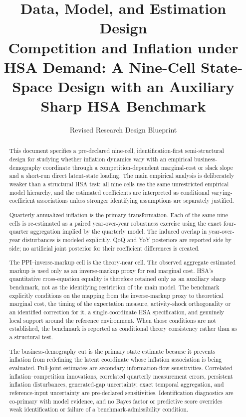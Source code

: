 \documentclass[11pt]{article}
\title{\textbf{Data, Model, and Estimation Design}\\
\large Competition and Inflation under HSA Demand: A Nine-Cell State-Space Design with an Auxiliary Sharp HSA Benchmark}
\author{}
\date{Revised Research Design Blueprint}
\begin{document}
\maketitle

\begin{abstract}
This document specifies a pre-declared nine-cell, identification-first semi-structural design for studying whether inflation dynamics vary with an empirical business-demography coordinate through a competition-dependent marginal-cost or slack slope and a short-run direct latent-state loading. The main empirical analysis is deliberately weaker than a structural HSA test: all nine cells use the same unrestricted empirical model hierarchy, and the estimated coefficients are interpreted as conditional varying-coefficient associations unless stronger identifying assumptions are separately justified.

Quarterly annualized inflation is the primary transformation. Each of the same nine cells is re-estimated as a paired year-over-year robustness exercise using the exact four-quarter aggregation implied by the quarterly model. The induced overlap in year-over-year disturbances is modeled explicitly. QoQ and YoY posteriors are reported side by side; no artificial joint posterior for their coefficient differences is created.

The PPI--inverse-markup cell is the theory-near cell. The observed aggregate estimated markup is used only as an inverse-markup proxy for real marginal cost. HSA's quantitative cross-equation equality is therefore retained only as an auxiliary sharp benchmark, not as the identifying restriction of the main model. The benchmark explicitly conditions on the mapping from the inverse-markup proxy to theoretical marginal cost, the timing of the expectation measure, activity-shock orthogonality or an identified correction for it, a single-coordinate HSA specification, and genuinely local support around the reference environment. When those conditions are not established, the benchmark is reported as conditional theory consistency rather than as a structural test.

The business-demography cut is the primary state estimate because it prevents inflation from redefining the latent coordinate whose inflation association is being evaluated. Full-joint estimates are secondary information-flow sensitivities. Correlated inflation--competition innovations, correlated quarterly measurement errors, persistent inflation disturbances, generated-gap uncertainty, exact temporal aggregation, and reference-input uncertainty are pre-declared sensitivities. Identification diagnostics are co-primary with model evidence, and no Bayes factor or predictive score overrides weak identification or failure of a benchmark-admissibility condition.
\end{abstract}
\end{document}
